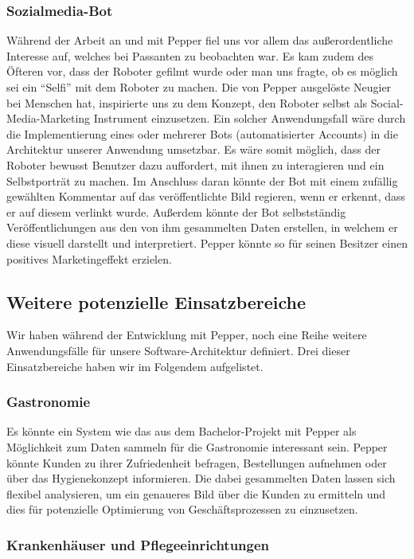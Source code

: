 \subsubsection{Sozialmedia-Bot}
\label{sec:Sozialmedia-Bot}
Während der Arbeit an und mit Pepper fiel uns vor allem das außerordentliche Interesse auf, welches bei Passanten zu beobachten war. Es kam zudem des Öfteren vor, dass der Roboter gefilmt wurde oder man uns fragte, ob es möglich sei ein “Selfi” mit dem Roboter zu machen. Die von Pepper ausgelöste Neugier bei Menschen hat, inspirierte uns zu dem Konzept, den Roboter selbst als Social-Media-Marketing Instrument einzusetzen.
Ein solcher Anwendungsfall wäre durch die Implementierung eines oder mehrerer Bots (automatisierter Accounts) in die Architektur unserer Anwendung umsetzbar. Es wäre somit möglich, dass der Roboter bewusst Benutzer dazu auffordert, mit ihnen zu interagieren und ein Selbstporträt zu machen. Im Anschluss daran könnte der Bot mit einem zufällig gewählten Kommentar auf das veröffentlichte Bild regieren, wenn er erkennt, dass er auf diesem verlinkt wurde. Außerdem könnte der Bot selbstständig Veröffentlichungen aus den von ihm gesammelten Daten erstellen, in welchem er diese visuell darstellt und interpretiert. Pepper könnte so für seinen Besitzer einen positives Marketingeffekt erzielen.

\subsection{Weitere potenzielle Einsatzbereiche}

Wir haben während der Entwicklung mit Pepper, noch eine Reihe weitere Anwendungsfälle für unsere Software-Architektur definiert. Drei dieser Einsatzbereiche haben wir im Folgendem aufgelistet.

\subsubsection{Gastronomie}

Es könnte ein System wie das aus dem Bachelor-Projekt mit Pepper als Möglichkeit zum Daten sammeln für die Gastronomie interessant sein. Pepper könnte Kunden zu ihrer Zufriedenheit befragen, Bestellungen aufnehmen oder über das Hygienekonzept informieren. Die dabei gesammelten Daten lassen sich flexibel analysieren, um ein genaueres Bild über die Kunden zu ermitteln und dies für potenzielle Optimierung von Geschäftsprozessen zu einzusetzen.

\subsubsection{Krankenhäuser und Pflegeeinrichtungen}

